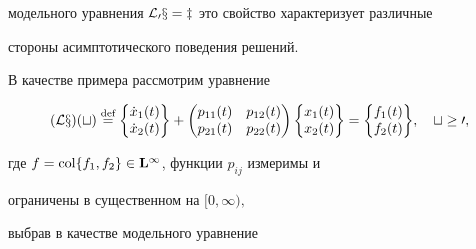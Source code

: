 модельного уравнения $\cal L_0x=z$ это свойство характеризует различные


стороны асимптотического поведения решений.





В качестве примера рассмотрим уравнение


\begin{equation}


(\cal L x)(t) \eqdef


\biggl\{


\begin{matrix}


\Dot x _1(t)\\


\Dot x _2(t)


\end{matrix}


\biggr\} +


\begin{pmatrix}


p_{11}(t)& p_{12}(t)\\


p_{21}(t) &p_{22}(t)


\end{pmatrix}


\biggl\{


\begin{matrix}


{x}_1(t)\\


{x}_2(t)


\end{matrix}


\biggr\} =


\biggl\{


\begin{matrix}


f_1(t)\\


f_2(t)


\end{matrix}


\biggr\}, \quad t\ge 0,


\end{equation}


где $f = \operatorname{col}\{f_1,f_2\}\in\bold L^\infty$, функции $p_{ij}$ измеримы и


ограничены в существенном на $[0,\infty),$


выбрав в качестве модельного уравнение


